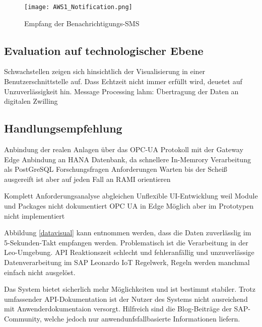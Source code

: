 \begin{figure}[ht]
    \centering
    \texttt{[image: AWS1\_Notification.png]}
    \caption{Empfang der Benachrichtigungs-SMS}
    \label{awsnoti}
\end{figure}

\subsection{Evaluation auf technologischer Ebene}
Schwachstellen zeigen sich hinsichtlich der Visualisierung in einer Benutzerschnittstelle auf.  
Dass Echtzeit nicht immer erfüllt wird, deuetet auf Unzuverlässigkeit hin.
Message Processing lahm: Übertragung der Daten an digitalen Zwilling
\subsection{Handlungsempfehlung}
Anbindung der realen Anlagen über das OPC-UA Protokoll mit der Gateway Edge
Anbindung an HANA Datenbank, da schnellere In-Memrory Verarbeitung als PostGreSQL
Forschungsfragen
Anforderungen
Warten bis der Scheiß ausgereift ist aber auf jeden Fall an RAMI orientieren


Komplett Anforderungsanalyse abgleichen
Unflexible UI-Entwicklung weil Module und Packages nicht dokumentiert
OPC UA in Edge Möglich aber im Prototypen nicht implementiert

Abbildung \ref{datavisual} kann entnommen werden, dass die Daten zuverlässlig im 5-Sekunden-Takt empfangen werden. Problematisch ist die Verarbeitung in der Leo-Umgebung.
API Reaktionszeit schlecht und fehleranfällig und unzuverlässige Datenverarbeitung im SAP Leonardo IoT Regelwerk,
Regeln werden manchmal einfach nicht ausgelöst.


Das System bietet sicherlich mehr Möglichkeiten und ist bestimmt stabiler. Trotz umfassender API-Dokumentation ist der Nutzer des Systems nicht ausreichend mit Anwenderdokumentaion versorgt. Hilfreich sind die Blog-Beiträge der SAP-Community, welche jedoch nur anwendunfsfallbasierte Informationen liefern.
\newpage
